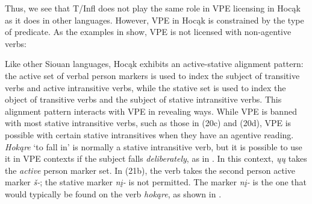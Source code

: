 \documentclass[output=paper]{LSP/langsci}
\begin{document}
Thus, we see that T/Infl does not play the same role in VPE licensing in Hocąk as it does in other languages. However, VPE in Hocąk is constrained by the type of predicate. As the examples in  show, VPE is not licensed with non-agentive verbs:


\begin{exe}
\ex
\begin{xlist}
\end{xlist}
\end{exe}

Like other Siouan languages, Hocąk exhibits an active-stative alignment pattern: the active set of verbal person markers is used to index the subject of transitive verbs and active intransitive verbs, while the stative set is used to index the object of transitive verbs and the subject of stative intransitive verbs. This alignment pattern interacts with VPE in revealing ways. While VPE is banned with most stative intransitive verbs, such as those in (20c) and (20d), VPE is possible with certain stative intransitives when they have an agentive reading. \emph{Hokąre} `to fall in' is normally a stative intransitive verb, but it is possible to use it in VPE contexts if the subject falls \emph{deliberately}, as in . In this context, \emph{ųų} takes the \emph{active} person marker set. In (21b), the verb takes the second person active marker \emph{š-}; the stative marker \emph{nį-} is not permitted. The marker \emph{nį-} is the one that would typically be found on the verb \emph{hokąre}, as shown in .
\end{document}

